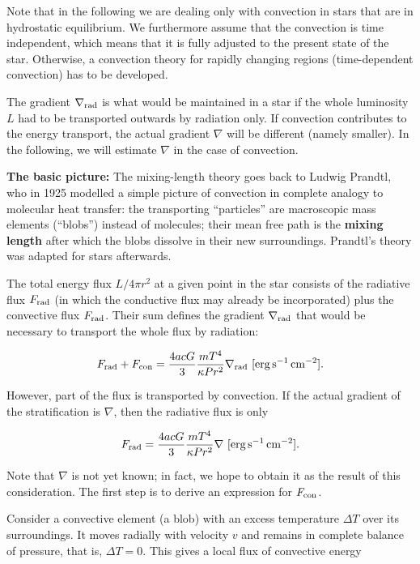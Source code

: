 \documentclass[a4paper,10pt]{article}
\begin{document}
{\noindent}Note that in the following we are dealing only with convection in stars that are in hydrostatic equilibrium. We furthermore assume that the convection is time independent, which means that it is fully adjusted to the present state of the star. Otherwise, a convection theory for rapidly changing regions (time-dependent convection) has to be developed.

{\noindent}The gradient $\nabla_{\rm rad}$ is what would be maintained in a star if the whole luminosity $L$ had to be transported outwards by radiation only. If convection contributes to the energy transport, the actual gradient $\nabla$ will be different (namely smaller). In the following, we will estimate $\nabla$ in the case of convection.

{\noindent}\textbf{The basic picture:} The mixing-length theory goes back to Ludwig Prandtl, who in 1925 modelled a simple picture of convection in complete analogy to molecular heat transfer: the transporting ``particles'' are macroscopic mass elements (``blobs'') instead of molecules; their mean free path is the \textbf{mixing length} after which the blobs dissolve in their new surroundings. Prandtl's theory was adapted for stars afterwards.

{\noindent}The total energy flux $L/4\pi r^2$ at a given point in the star consists of the radiative flux $F_{\rm rad}$ (in which the conductive flux may already be incorporated) plus the convective flux $F_{\rm rad}$. Their sum defines the gradient $\nabla_{\rm rad}$ that would be necessary to transport the whole flux by radiation:

\begin{align*}
    F_{\rm rad} + F_{\rm con} = \frac{4acG}{3}\frac{mT^4}{\kappa Pr^2} \nabla_{\rm rad} ~ [{\rm erg\,s^{-1}\,cm^{-2}}].
\end{align*}

{\noindent}However, part of the flux is transported by convection. If the actual gradient of the stratification is $\nabla$, then the radiative flux is only

\begin{align*}
    F_{\rm rad} = \frac{4acG}{3}\frac{mT^4}{\kappa Pr^2} \nabla ~ [{\rm erg\,s^{-1}\,cm^{-2}}].
\end{align*}

{\noindent}Note that $\nabla$ is not yet known; in fact, we hope to obtain it as the result of this consideration. The first step is to derive an expression for $F_{\rm con}$.

{\noindent} Consider a convective element (a blob) with an excess temperature $\Delta T$ over its surroundings. It moves radially with velocity $v$ and remains in complete balance of pressure, that is, $\Delta T=0$. This gives a local flux of convective energy
\end{document}
